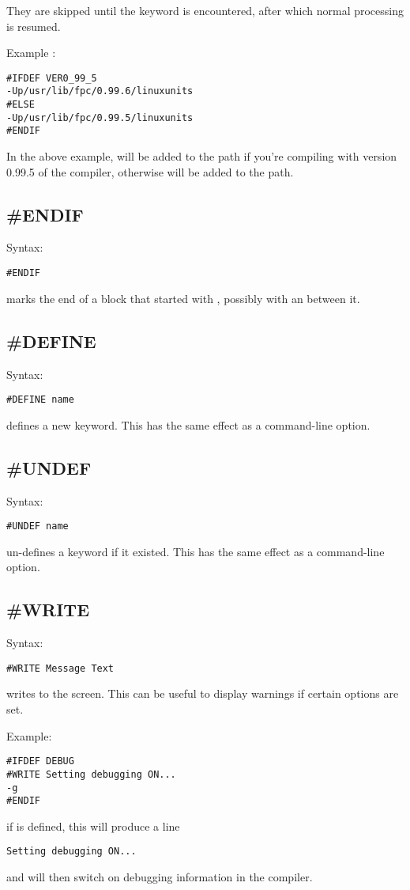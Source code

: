 \documentclass{report}
\begin{document}
They are skipped until the keyword  is
encountered, after which normal processing is resumed.

Example :
\begin{verbatim}
#IFDEF VER0_99_5
-Up/usr/lib/fpc/0.99.6/linuxunits
#ELSE
-Up/usr/lib/fpc/0.99.5/linuxunits
#ENDIF
\end{verbatim}
In the above example,  will be added to
the path if you're compiling with version 0.99.5 of the compiler,
otherwise  will be added to the path.

\subsection{\#ENDIF}
Syntax:
\begin{verbatim}
#ENDIF
\end{verbatim} 
 marks the end of a block that started with ,
possibly with an  between it.

\subsection{\#DEFINE}
Syntax:
\begin{verbatim}
#DEFINE name
\end{verbatim}
 defines a new keyword. This has the same effect as a 
  command-line option.

\subsection{\#UNDEF}
Syntax:
\begin{verbatim}
#UNDEF name
\end{verbatim}
 un-defines a keyword if it existed. 
This has the same effect as a   command-line option.

\subsection{\#WRITE}
Syntax:
\begin{verbatim}
#WRITE Message Text
\end{verbatim}
 writes  to the screen.
This can be useful to display warnings if certain options are set.

Example:
\begin{verbatim}
#IFDEF DEBUG
#WRITE Setting debugging ON...
-g
#ENDIF
\end{verbatim}
if  is defined, this will produce a line
\begin{verbatim}
Setting debugging ON...
\end{verbatim}
and will then switch on debugging information in the compiler.
\end{document}
